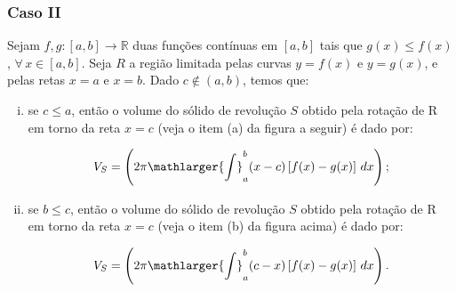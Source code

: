 \cleardoublepage\documentclass[../main.tex]{subfiles}
\begin{document}
\subsubsection*{Caso II}
Sejam \(f,g:[a,b] \to \mathbb{R}\) duas funções contínuas em \([a,b]\) tais que \(g(x)\leq f(x)\), \(\forall\, x\in [a,b]\). Seja \(R\) a região limitada pelas curvas \(y=f(x)\) e \(y=g(x)\), e pelas retas \(x=a\) e \(x=b\). Dado \(c \notin (a,b)\), temos que:
\begin{enumerate}[i.]
    \item se \(c\leq a\), então o volume do sólido de revolução \(S\) obtido pela rotação de R em torno da reta \(x=c\) (veja o item (a) da figura a seguir) é dado por:

\[ V_S= \left( 2\pi \mathlarger{\int}^{b}_{a} (x-c)\left[f(x)-g(x)\right]\,dx \right); \]
\begin{figure}[H]
\center
{}\qquad
{}
\end{figure}
\item se \(b\leq c\), então o volume do sólido de revolução \(S\) obtido pela rotação de R em torno da reta \(x=c\) (veja o item (b) da figura acima) é dado por:

\[ V_S= \left( 2\pi \mathlarger{\int}^{b}_{a} (c-x)\left[f(x)-g(x)\right]\,dx \right). \]
\end{enumerate}
\end{document}
